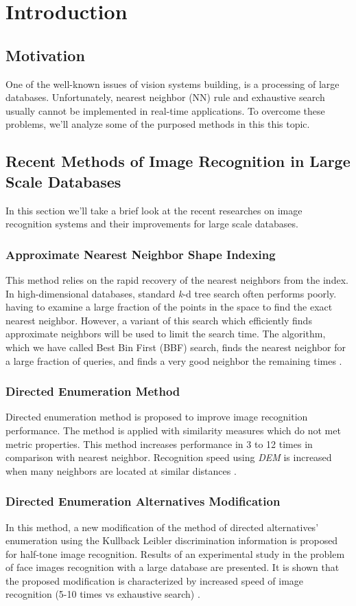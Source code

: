 \chapter{Introduction}

\section{Motivation}
One of the well-known issues of vision systems building, is a processing of
large databases. Unfortunately, nearest neighbor (NN) rule and exhaustive
search usually cannot be implemented in real-time applications\cite{motiv1}. To overcome these problems, we'll analyze some of the purposed methods in this this topic.

\section{Recent Methods of Image Recognition in Large Scale Databases}
In this section we'll take a brief look at the recent researches on image recognition systems and their improvements for large scale databases.

\subsection{Approximate Nearest Neighbor Shape Indexing}
This method relies on the rapid recovery of the nearest neighbors from the index. In high-dimensional databases, standard \textit{k}-d tree search often performs poorly.  having to examine a large fraction of the points in the space to find the exact nearest neighbor. However, a variant of this search which efficiently finds approximate neighbors will be used to limit the search time. The algorithm, which we have called Best
Bin First (BBF) search, finds the nearest neighbor for a
large fraction of queries, and finds a very good neighbor
the remaining times \cite{motiv2}.
	
\subsection{Directed Enumeration Method}
Directed enumeration method is proposed to improve image recognition performance. The method is applied with similarity measures which do not met metric properties. This method increases performance in 3 to 12 times in comparison with nearest neighbor. Recognition speed using \textit{DEM} is increased when many neighbors are located at similar distances \cite{motiv3}.


\subsection{Directed Enumeration Alternatives Modification}
In this method, a new modification of the method of directed alternatives’
enumeration using the Kullback Leibler discrimination information is proposed
for half-tone image recognition. Results of an experimental study in
the problem of face images recognition with a large database are presented.
It is shown that the proposed modification is characterized by increased
speed of image recognition (5-10 times vs exhaustive search) \cite{motiv4}.
